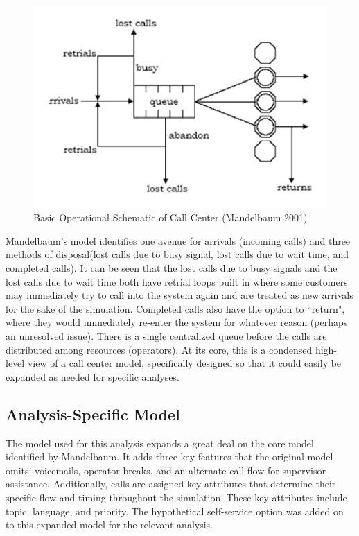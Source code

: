 \documentclass[12pt]{article}
\begin{document}
	\begin{figure}[h]
	\includegraphics[scale=.45]{call_center_layout.png}
	\caption{Basic Operational Schematic of Call Center (Mandelbaum 2001)}
	\end{figure}

Mandelbaum's model identifies one avenue for arrivals (incoming calls) and three methods of disposal(lost calls due to busy signal, lost calls due to wait time, and completed calls).  It can be seen that the lost calls due to busy signals and the lost calls due to wait time both have retrial loops built in where some customers may immediately try to call into the system again and are treated as new arrivals for the sake of the simulation.  Completed calls also have the option to ``return", where they would immediately re-enter the system for whatever reason (perhaps an unresolved issue).  There is a single centralized queue before the calls are distributed among resources (operators).  At its core, this is a condensed high-level view of a call center model, specifically designed so that it could easily be expanded as needed for specific analyses.

\subsection{Analysis-Specific Model}
The model used for this analysis expands a great deal on the core model identified by Mandelbaum.  It adds three key features that the original model omits: voicemails, operator breaks, and an alternate call flow for supervisor assistance.  Additionally, calls are assigned key attributes that determine their specific flow and timing throughout the simulation.  These key attributes include topic, language, and priority.  The hypothetical self-service option was added on to this expanded model for the relevant analysis.
\end{document}

